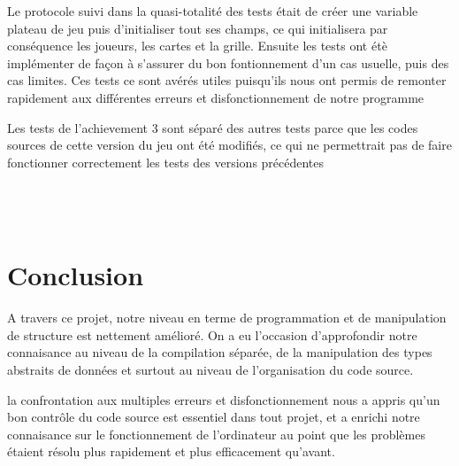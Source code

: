 \documentclass[a4paper]{article}
\begin{document}
Le protocole suivi dans la quasi-totalité des tests était de créer une variable plateau de jeu puis d'initialiser tout ses champs, ce qui initialisera par conséquence les joueurs, les cartes et la grille. Ensuite les tests ont étè implémenter de façon à s'assurer du bon fontionnement d'un cas usuelle, puis des cas limites. Ces tests ce sont avérés utiles puisqu'ils nous ont permis de remonter rapidement aux différentes erreurs et disfonctionnement de notre programme 

Les tests de l'achievement 3 sont séparé des autres tests parce que les codes sources de cette version du jeu ont été modifiés, ce qui ne permettrait pas de faire fonctionner correctement les tests des versions précédentes\\\\\\\\

\section{Conclusion}

A travers ce projet, notre niveau en terme de programmation et de manipulation de structure est nettement amélioré. On a eu l'occasion d'approfondir notre connaisance au niveau de la compilation séparée, de la manipulation des types abstraits de données et surtout au niveau de l'organisation du code source.

la confrontation aux multiples erreurs et disfonctionnement nous a appris qu'un bon contrôle du code source est essentiel dans tout projet, et a enrichi notre connaisance sur le fonctionnement de l'ordinateur au point que les problèmes étaient résolu plus rapidement et plus efficacement qu'avant.
\end{document}
